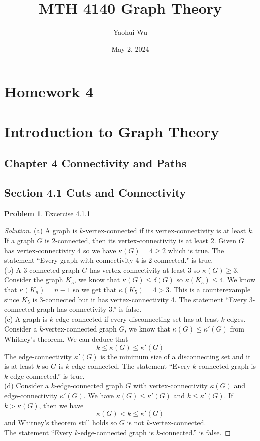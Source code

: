 \documentclass[12pt]{article}
\title{MTH 4140 Graph Theory}
\author{Yaohui Wu}
\date{May 2, 2024}
\theoremstyle{definition}
\newtheorem{problem}{Problem}
\newenvironment*{solution}{\begin{proof}[Solution]}{\end{proof}}
\begin{document}
\maketitle
\section*{Homework 4}
\section*{Introduction to Graph Theory}

\subsection*{Chapter 4 Connectivity and Paths}
\subsection*{Section 4.1 Cuts and Connectivity}

\begin{problem}
    Excercise 4.1.1
\end{problem}
\begin{solution}
    (a) A graph is \(k\)-vertex-connected if its vertex-connectivity is at least \(k\).
    If a graph \(G\) is 2-connected, then its vertex-connectivity is at least 2.
    Given \(G\) has vertex-connectivity 4 so we have \(\kappa(G)=4\geq2\) which is true.
    The statement ``Every graph with connectivity 4 is 2-connected." is true. \\
    (b) A 3-connected graph \(G\) has vertex-connectivity at least 3 so \(\kappa(G)\geq3\).
    Consider the graph \(K_5\), we know that \(\kappa(G)\leq\delta(G)\) so \(\kappa(K_5)\leq4\).
    We know that \(\kappa(K_n)=n-1\) so we get that \(\kappa(K_5)=4>3\).
    This is a counterexample since \(K_5\) is 3-connected but it has vertex-connectivity 4.
    The statement ``Every 3-connected graph has connectivity 3.'' is false. \\
    (c) A graph is \(k\)-edge-connected if every disconnecting set has at least \(k\) edges.
    Consider a \(k\)-vertex-connected graph \(G\), we know that \(\kappa(G)\leq\kappa'(G)\) from Whitney's theorem.
    We can deduce that \[k \leq \kappa(G) \leq \kappa'(G) \]
    The edge-connectivity \(\kappa'(G)\) is the minimum size of a disconnecting set and it is at least \(k\) so \(G\) is \(k\)-edge-connected.
    The statement ``Every \(k\)-connected graph is \(k\)-edge-connected.'' is true. \\
    (d) Consider a \(k\)-edge-connected graph \(G\) with vertex-connectivity \(\kappa(G)\) and \\ edge-connectivity \(\kappa'(G)\).
    We have \(\kappa(G)\leq\kappa'(G)\) and \(k\leq\kappa'(G)\).
    If \(k>\kappa(G)\), then we have \[\kappa(G)<k\leq\kappa'(G)\] and Whitney's theorem still holds so \(G\) is not \(k\)-vertex-connected. \\
    The statement ``Every \(k\)-edge-connected graph is \(k\)-connected.'' is false.
\end{solution}
\end{document}
